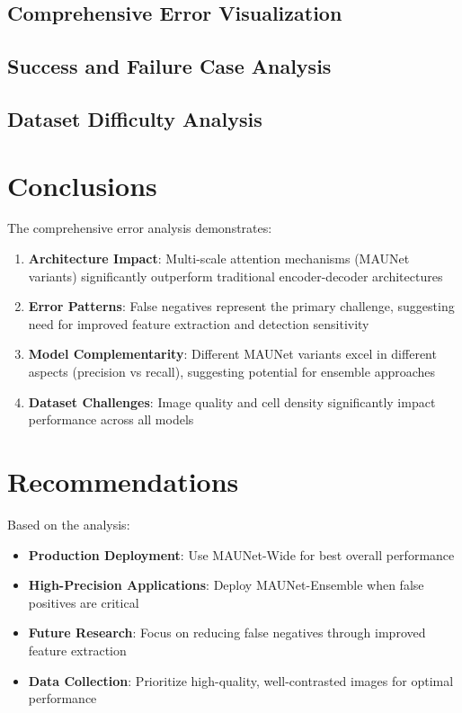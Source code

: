 \documentclass[11pt,a4paper]{article}
\begin{document}
\subsection{Comprehensive Error Visualization}


\subsection{Success and Failure Case Analysis}


\subsection{Dataset Difficulty Analysis}


\section{Conclusions}

The comprehensive error analysis demonstrates:

\begin{enumerate}
\item \textbf{Architecture Impact}: Multi-scale attention mechanisms (MAUNet variants) significantly outperform traditional encoder-decoder architectures
\item \textbf{Error Patterns}: False negatives represent the primary challenge, suggesting need for improved feature extraction and detection sensitivity
\item \textbf{Model Complementarity}: Different MAUNet variants excel in different aspects (precision vs recall), suggesting potential for ensemble approaches
\item \textbf{Dataset Challenges}: Image quality and cell density significantly impact performance across all models
\end{enumerate}

\section{Recommendations}

Based on the analysis:
\begin{itemize}
\item \textbf{Production Deployment}: Use MAUNet-Wide for best overall performance
\item \textbf{High-Precision Applications}: Deploy MAUNet-Ensemble when false positives are critical
\item \textbf{Future Research}: Focus on reducing false negatives through improved feature extraction
\item \textbf{Data Collection}: Prioritize high-quality, well-contrasted images for optimal performance
\end{itemize}
\end{document}
